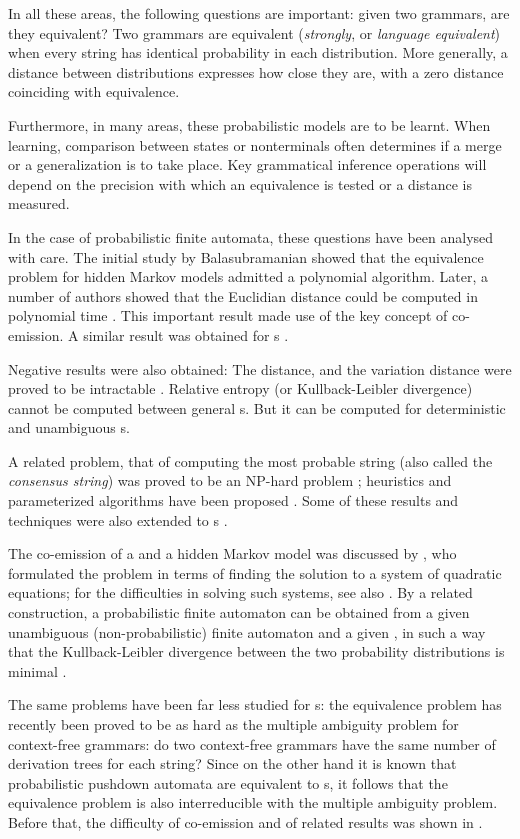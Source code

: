 \documentclass[submission]{eptcs} \usepackage{breakurl}             \usepackage[english]{babel}
\begin{document}
In all these areas, the following questions are important: given two grammars, are they equivalent? Two grammars are equivalent (\emph{strongly}, or \emph{language equivalent}) when every string has identical probability in each distribution. More generally, a distance between distributions expresses how close they are, with a zero distance coinciding with equivalence.

Furthermore, in many areas, these probabilistic models are to be learnt. When learning, comparison between states or nonterminals often determines if a merge or a generalization is to take place.  Key grammatical inference operations \cite{higu10} will depend on the precision with which an equivalence is tested or a distance is measured.

In the case of probabilistic finite automata, these questions have been analysed with care. The initial study by Balasubramanian \cite{bala93} showed that the equivalence problem for hidden Markov models admitted a polynomial algorithm. Later, a number of authors showed that the Euclidian distance could be computed in polynomial time \cite{lyng99}.  This important result made use of the key concept of co-emission. A similar result was obtained for s \cite{murg04}. 

Negative results were also obtained: The  distance, and the variation distance were proved to be intractable \cite{lyng01}.
Relative entropy (or Kullback-Leibler divergence) cannot be computed between general s. But it can be computed for deterministic \cite{carr97} and unambiguous \cite{cort08} s.

A related problem, that of computing the most probable string (also called the \emph{consensus string}) was proved to be an NP-hard problem \cite{casa00a,lyng02};  heuristics and parameterized algorithms have been proposed \cite{higu13b}. Some of these results and techniques were also extended to s \cite{higu13a}.

The co-emission of a  and a hidden Markov model was discussed by \cite{jago01}, who formulated the problem in terms of finding the solution to a system of quadratic equations; for the difficulties in solving such systems, see also \cite{etessami2009}.
By a related construction, a probabilistic finite automaton can be obtained from a given unambiguous (non-probabilistic) finite automaton and a given , in such a way that the Kullback-Leibler divergence between the two probability distributions is minimal \cite{nede04}.

The same problems have been far less studied for s:  the equivalence problem has recently been proved \cite{fore14} to be as hard as the multiple ambiguity problem for context-free grammars: do two context-free grammars have the same number of derivation trees for each string?
Since on the other hand it is known \cite{abne99} that probabilistic pushdown automata are equivalent to  s, it follows that the equivalence problem is also interreducible with the multiple ambiguity problem. Before that, the difficulty of co-emission and of related results was shown in \cite{jago01}.
\end{document}
